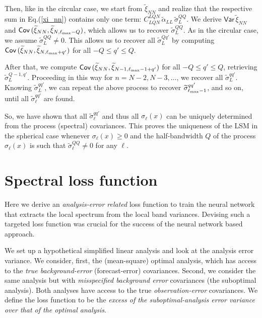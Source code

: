\documentclass[12pt]{article}
\newcommand{\Var}{{\mathsf{Var}}\,}
\newcommand{\Cov}{{\mathsf{Cov}}\,}
\begin{document}
Then,  like in the circular case, we start from $\widetilde\xi_{NN}$
and realize that the respective sum in Eq.(\ref{xi_nn}) contains only one term:
$C_{LQN}^{LQN}\,\widetilde\alpha_{LL} \,\widetilde\sigma_L^{QQ}$.
We derive  $\Var \widetilde\xi_{NN}$ and 
$\Cov (\widetilde\xi_{NN},\widetilde\xi_{N,\ell_{\rm max}-Q})$, which allows us to recover  $\widetilde\sigma_L^{QQ}$.
As in the circular case, we assume $\widetilde\sigma_L^{QQ} \ne 0$.
This allows us to recover all $\widetilde\sigma_L^{Qq'}$ by 
computing $\Cov (\widetilde\xi_{NN},\widetilde\xi_{N,\ell_{\rm max}+q'})$ for all $-Q \le q' \le Q$.


After that, we compute $\Cov (\widetilde\xi_{NN},\widetilde\xi_{N-1,\ell_{\rm max}-1+q'})$ for all $-Q \le q' \le Q$,
retrieving  $\widetilde\sigma_L^{Q-1,q'}$. Proceeding in this way for $n=N-2, N-3,\dots$, 
we recover all $\widetilde\sigma_L^{qq'}$.
Knowing $\widetilde\sigma_L^{qq'}$, we can repeat the above process to recover 
 $\widetilde\sigma_{\ell_{\rm max}-1}^{qq'}$, and so on, until all $\widetilde\sigma_\ell^{qq'}$ are found.

So, we have shown that all  $\widetilde\sigma_\ell^{qq'}$ and thus all  $\sigma_\ell(x)$
can be uniquely determined from the process (spectral) covariances.
This proves the uniqueness of the LSM in the spherical case whenever 
$\sigma_\ell(x) \ge 0$ 
and the half-bandwidth $Q$ of the process $\sigma_\ell(x)$ is such that  $\widetilde\sigma_\ell^{QQ} \ne 0$ 
 for any $\ell$.







\section {Spectral loss function}
\label{app_specLoss}



Here we derive an {\em analysis-error related} loss function to train the neural network 
that extracts the local spectrum from the local band variances.
Devising such a targeted loss function was crucial for the success of the neural network based approach.

We set up a hypothetical simplified linear analysis and look at the analysis error variance.
We consider, first, the (mean-square) optimal analysis, which has access to the  {\em true background-error}
(forecast-error)
covariances. Second, we consider the same analysis but with  {\em misspecified background 
error} covariances (the suboptimal analysis). 
Both analyses have access to the true {\em observation-error} covariances.
We define the loss function to be the {\em excess of the suboptimal-analysis error variance
over that of the optimal analysis}.
\end{document}
